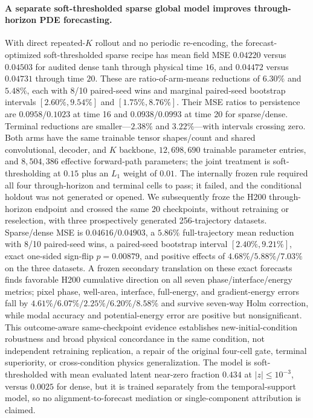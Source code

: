 \documentclass[11pt]{article}
\begin{document}
\paragraph{A separate soft-thresholded sparse global model improves through-horizon PDE forecasting.}
With direct repeated-\(K\) rollout and no periodic re-encoding, the forecast-optimized soft-thresholded sparse recipe has mean field MSE \(0.04220\) versus \(0.04503\) for audited dense tanh through physical time \(16\), and \(0.04472\) versus \(0.04731\) through time \(20\). These are ratio-of-arm-means reductions of \(6.30\%\) and \(5.48\%\), each with 8/10 paired-seed wins and marginal paired-seed bootstrap intervals \([2.60\%,9.54\%]\) and \([1.75\%,8.76\%]\). Their MSE ratios to persistence are \(0.0958/0.1023\) at time 16 and \(0.0938/0.0993\) at time 20 for sparse/dense. Terminal reductions are smaller---\(2.38\%\) and \(3.22\%\)---with intervals crossing zero. Both arms have the same trainable tensor shapes/count and shared convolutional, decoder, and \(K\) backbone, \(12{,}698{,}690\) trainable parameter entries, and \(8{,}504{,}386\) effective forward-path parameters; the joint treatment is soft-thresholding at \(0.15\) plus an \(L_1\) weight of \(0.01\). The internally frozen rule required all four through-horizon and terminal cells to pass; it failed, and the conditional holdout was not generated or opened. We subsequently froze the H200 through-horizon endpoint and crossed the same 20 checkpoints, without retraining or reselection, with three prospectively generated 256-trajectory datasets. Sparse/dense MSE is \(0.04616/0.04903\), a \(5.86\%\) full-trajectory mean reduction with 8/10 paired-seed wins, a paired-seed bootstrap interval \([2.40\%,9.21\%]\), exact one-sided sign-flip \(p=0.00879\), and positive effects of \(4.68\%/5.88\%/7.03\%\) on the three datasets. A frozen secondary translation on these exact forecasts finds favorable H200 cumulative direction on all seven phase/interface/energy metrics; pixel phase, well-area, interface, full-energy, and gradient-energy errors fall by \(4.61\%/6.07\%/2.25\%/6.20\%/8.58\%\) and survive seven-way Holm correction, while modal accuracy and potential-energy error are positive but nonsignificant. This outcome-aware same-checkpoint evidence establishes new-initial-condition robustness and broad physical concordance in the same condition, not independent retraining replication, a repair of the original four-cell gate, terminal superiority, or cross-condition physics generalization. The model is soft-thresholded with mean evaluated latent near-zero fraction \(0.434\) at \(|z|\le10^{-3}\), versus \(0.0025\) for dense, but it is trained separately from the temporal-support model, so no alignment-to-forecast mediation or single-component attribution is claimed.
\end{document}
